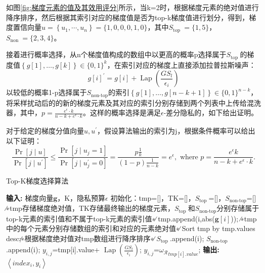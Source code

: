 如图\ref{fig:梯度元素的值及其效用评分}所示，当k=2时，根据梯度元素的绝对值进行降序排序，然后根据其索引对应的梯度值是否为top-k梯度值进行划分，得到，梯度置信向量$u=\left\{u_{1}, \cdots, u_{n}\right\}=\{1,0,0,0,1,0\}$，其中$S_{\text {top }}=\{1,5\}$，$S_{\text {non }}=\{2,3,4\}$。

接着进行概率选择，从n个梯度值构成的数组中以更高的概率p选择属于$S_{\text {top }}$的梯度值$\left\{g[1], \ldots, g[k]\right\} \in\{0,1\}^{k}$，在索引对应的梯度上直接添加拉普拉斯噪声：
$$
g[i]^{\prime}=g[i]+ \operatorname{Lap}\left(\frac{GS_{l}}{\epsilon_{i}}\right)
$$
以较低的概率1-p选择属于$S_{\text {non-top}} $的索引$\left\{g[1], \ldots, g[n-k+1]\right\} \in\{0,1\}^{n-k}$，将采样扰动后的的新的梯度元素及其对应的索引分别存储到两个列表中上传给混洗器，其中，$p=\frac{e^{\epsilon} \cdot k}{n-k+e^{\epsilon} \cdot k}$。这样的概率选择是满足$\epsilon$-差分隐私的，如下给出证明。

\begin{theorem}\label{隐私性证明-topk}
对于给定的梯度分值向量$u, u^{\prime}$，假设算法输出的索引为j，根据条件概率可以给出以下证明：
$$
\frac{\operatorname{Pr}[j \mid u]}{\operatorname{Pr}\left[j \mid u^{\prime}\right]} \leq \frac{\operatorname{Pr}\left[j \mid u_{j}=1\right]}{\operatorname{Pr}\left[j \mid u_{j}^{\prime}=0\right]}=\frac{p \frac{1}{k}}{(1-p) \frac{1}{n-k}}=e^{\epsilon}, \text { where } p=\frac{e^{\epsilon} k}{n-k+e^{\epsilon} \cdot k}.
$$
\end{theorem}

\begin{algorithm}[!htb]
	\caption{Top-K梯度选择算法}
	\label{Top-K梯度选择算法}
	\begin{algorithmic}[1]
		\footnotesize
		\STATE \textbf{输入:} 梯度向量$\mathbf{g}$，K，隐私预算$\epsilon$
		\STATE 初始化：tmp=[]，TK=[]，$S_{\text {top }}$=[]，$S_{\text {non-top}}$=[] ∕∗tmp存储梯度绝对值，TK存储最终输出的梯度元素，$S_{\text {top }}$和$S_{\text {non-top}}$分别存储属于top-k元素的索引值和不属于top-k元素的索引值∗∕
			\STATE tmp.append({i,abs($\mathbf{g}[i]$)}); ∕∗tmp中的每个元素分别存储数组的索引和对应的元素绝对值∗∕
		\ENDFOR
		\STATE Sort tmp by tmp.values desc;∕∗根据梯度绝对值对tmp数组进行降序排序∗∕
				\STATE $S_{\text {top }}$.append(i);
				\ELSE
				\STATE $S_{\text {non-top }}$.append(i);
				\ENDIF 
		\ENDFOR
				\STATE $y_{i, j}$=tmp[i].value+ $\operatorname{Lap}\left(\frac{GS_{l}}{\epsilon_{i}}\right)$;
				\ELSE
				\STATE $y_{i, j}$=${\omega_{\mathcal{R}}}_{tmp[i].value}$;
				\ENDIF
		\ENDFOR
		\STATE \textbf{输出:} $\left\langle index_{i}, y_{i}\right\rangle$
	\end{algorithmic}
\end{algorithm}

